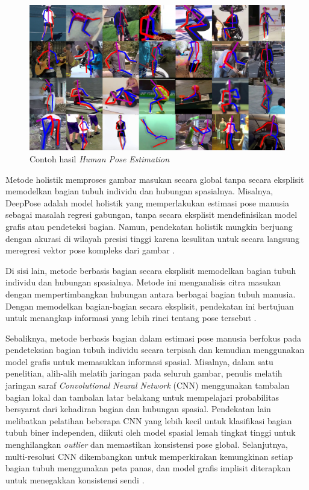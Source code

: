 \begin{figure}[H]
  \centering
  \includegraphics[scale=0.95]{gambar/humanpose.png}
  \caption{Contoh hasil \emph{Human Pose Estimation} \parencite{Newell}}
  \label{fig:humanposeestimation}
\end{figure}

Metode holistik memproses gambar masukan secara global tanpa secara eksplisit memodelkan bagian tubuh individu dan hubungan spasialnya. Misalnya, DeepPose adalah model holistik yang memperlakukan estimasi pose manusia sebagai masalah regresi gabungan, tanpa secara eksplisit mendefinisikan model grafis atau pendeteksi bagian. Namun, pendekatan holistik mungkin berjuang dengan akurasi di wilayah presisi tinggi karena kesulitan untuk secara langsung meregresi vektor pose kompleks dari gambar \parencite{Shetty}.

Di sisi lain, metode berbasis bagian secara eksplisit memodelkan bagian tubuh individu dan hubungan spasialnya. Metode ini menganalisis citra masukan dengan mempertimbangkan hubungan antara berbagai bagian tubuh manusia. Dengan memodelkan bagian-bagian secara eksplisit, pendekatan ini bertujuan untuk menangkap informasi yang lebih rinci tentang pose tersebut \parencite{Shetty}.

Sebaliknya, metode berbasis bagian dalam estimasi pose manusia berfokus pada pendeteksian bagian tubuh individu secara terpisah dan kemudian menggunakan model grafis untuk memasukkan informasi spasial. Misalnya, dalam satu penelitian, alih-alih melatih jaringan pada seluruh gambar, penulis melatih jaringan saraf \emph{Convolutional Neural Network} (CNN) menggunakan tambalan bagian lokal dan tambalan latar belakang untuk mempelajari probabilitas bersyarat dari kehadiran bagian dan hubungan spasial. Pendekatan lain melibatkan pelatihan beberapa CNN yang lebih kecil untuk klasifikasi bagian tubuh biner independen, diikuti oleh model spasial lemah tingkat tinggi untuk menghilangkan \emph{outlier} dan memastikan konsistensi pose global. Selanjutnya,  multi-resolusi CNN dikembangkan untuk memperkirakan kemungkinan setiap bagian tubuh menggunakan peta panas, dan model grafis implisit diterapkan untuk menegakkan konsistensi sendi \parencite{Shetty}.

